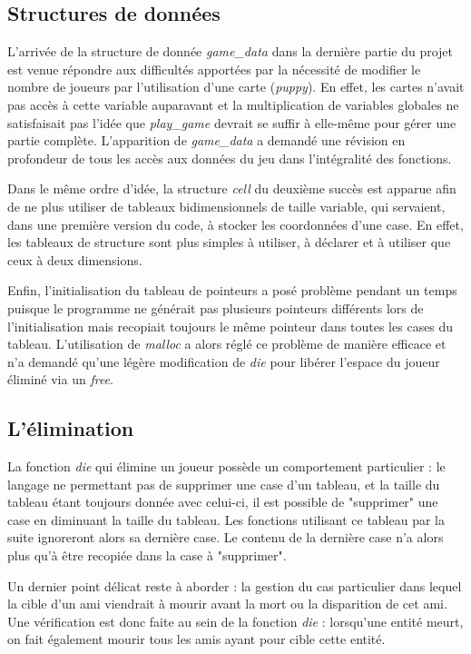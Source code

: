\documentclass[12pt]{article}
\begin{document}
\subsection{Structures de données}
L'arrivée de la structure de donnée \textit{game\_data} dans la dernière partie du projet est venue répondre aux difficultés apportées par la nécessité de modifier le nombre de joueurs par l'utilisation d'une carte (\textit{puppy}).
En effet, les cartes n'avait pas accès à cette variable auparavant et la multiplication de variables globales ne satisfaisait pas l'idée que \textit{play\_game} devrait se suffir à elle-même pour gérer une partie complète.
L'apparition de \textit{game\_data} a demandé une révision en profondeur de tous les accès aux données du jeu dans l'intégralité des fonctions.

Dans le même ordre d'idée, la structure \textit{cell} du deuxième succès est apparue afin de ne plus utiliser de tableaux bidimensionnels de taille variable, qui servaient, dans une première version du code, à stocker les coordonnées d'une case.
En effet, les tableaux de structure sont plus simples à utiliser, à déclarer et à utiliser que ceux à deux dimensions.

Enfin, l'initialisation du tableau de pointeurs a posé problème pendant un temps puisque le programme ne générait pas plusieurs pointeurs différents lors de l'initialisation mais recopiait toujours le même pointeur dans toutes les cases du tableau. L'utilisation de \textit{malloc} a alors réglé ce problème de manière efficace et n'a demandé qu'une légère modification de \textit{die} pour libérer l'espace du joueur éliminé via un \textit{free}.

\subsection{L'élimination}
La fonction \textit{die} qui élimine un joueur possède un comportement particulier : le langage ne permettant pas de supprimer une case d'un tableau, et la taille du tableau étant toujours donnée avec celui-ci, il est possible de "supprimer" une case en diminuant la taille du tableau.
Les fonctions utilisant ce tableau par la suite ignoreront alors sa dernière case. Le contenu de la dernière case n'a alors plus qu'à être recopiée dans la case à "supprimer".

\bigbreak

Un dernier point délicat reste à aborder : la gestion du cas particulier dans lequel la cible d'un ami viendrait à mourir avant la mort ou la disparition de cet ami. Une vérification est donc faite au sein de la fonction \textit{die} : lorsqu'une entité meurt, on fait également mourir tous les amis ayant pour cible cette entité.
\end{document}
